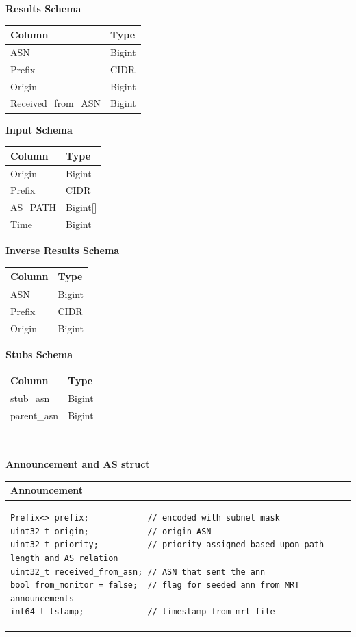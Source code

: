 \documentclass[letterpaper]{article}
\begin{document}
\textbf{Results Schema}

\begin{longtable}[]{@{}l|l@{}}
\toprule
\textbf{Column} & \textbf{Type}\tabularnewline
\endhead
\midrule
ASN & Bigint\tabularnewline
Prefix & CIDR\tabularnewline
Origin & Bigint\tabularnewline
Received\_from\_ASN & Bigint\tabularnewline
\bottomrule
\end{longtable}

\textbf{Input Schema}

\begin{longtable}[]{@{}l|l@{}}
\toprule
\textbf{Column} & \textbf{Type}\tabularnewline
\endhead
\midrule
Origin & Bigint\tabularnewline
Prefix & CIDR\tabularnewline
AS\_PATH & Bigint{[}{]}\tabularnewline
Time & Bigint\tabularnewline
\bottomrule
\end{longtable}

\textbf{Inverse Results Schema}

\begin{longtable}[]{@{}l|l@{}}
\toprule
\textbf{Column} & \textbf{Type}\tabularnewline
\endhead
\midrule
ASN & Bigint\tabularnewline
Prefix & CIDR\tabularnewline
Origin & Bigint\tabularnewline
\bottomrule
\end{longtable}

\textbf{Stubs Schema}

\begin{longtable}[]{@{}l|l@{}}
\toprule
\textbf{Column} & \textbf{Type}\tabularnewline
\endhead
\midrule
stub\_asn & Bigint\tabularnewline
parent\_asn & Bigint\tabularnewline
\bottomrule
\end{longtable}

\textbf{\\
}

\textbf{Announcement and AS struct}

\begin{longtable}[]{@{}l@{}}
\toprule
\textbf{Announcement}\tabularnewline
\midrule
\endhead
\begin{minipage}[t]{0.97\columnwidth}\raggedright
\begin{verbatim}
Prefix<> prefix;            // encoded with subnet mask
uint32_t origin;            // origin ASN
uint32_t priority;          // priority assigned based upon path length and AS relation
uint32_t received_from_asn; // ASN that sent the ann
bool from_monitor = false;  // flag for seeded ann from MRT announcements
int64_t tstamp;             // timestamp from mrt file

\end{verbatim}
\end{minipage}\tabularnewline
\bottomrule
\end{longtable}
\end{document}
